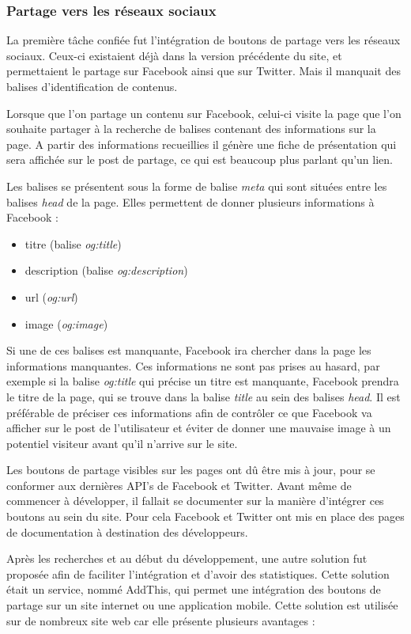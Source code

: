 \documentclass[12pt,a4paper]{article}
\begin{document}
\subsubsection{Partage vers les réseaux sociaux}
La première tâche confiée fut l'intégration de boutons de partage vers les réseaux sociaux. Ceux-ci existaient déjà dans la version précédente du site, et permettaient le partage sur Facebook ainsi que sur Twitter. Mais il manquait des balises d'identification de contenus.\par 
Lorsque que l'on partage un contenu sur Facebook, celui-ci visite la page que l'on souhaite partager à la recherche de balises contenant des informations sur la page. A partir des informations recueillies il génère une fiche de présentation qui sera affichée sur le post de partage, ce qui est beaucoup plus parlant qu'un lien.\par
Les balises se présentent sous la forme de balise \textit{meta} qui sont situées entre les balises \textit{head} de la page. Elles permettent de donner plusieurs informations à Facebook :
\begin{itemize}
\item titre (balise \textit{og:title})
\item description (balise \textit{og:description})
\item url (\textit{og:url})
\item image (\textit{og:image})
\end{itemize}
Si une de ces balises est manquante, Facebook ira chercher dans la page les informations manquantes. Ces informations ne sont pas prises au hasard, par exemple si la balise \textit{og:title} qui précise un titre est manquante, Facebook prendra le titre de la page, qui se trouve dans la balise \textit{title} au sein des balises \textit{head}. Il est préférable de préciser ces informations afin de contrôler ce que Facebook va afficher sur le post de l'utilisateur et éviter de donner une mauvaise image à un potentiel visiteur avant qu'il n'arrive sur le site.\par
\bigskip
Les boutons de partage visibles sur les pages ont dû être mis à jour, pour se conformer aux dernières API's de Facebook et Twitter. Avant même de commencer à développer, il fallait se documenter sur la manière d'intégrer ces boutons au sein du site. Pour cela Facebook et Twitter ont mis en place des pages de documentation à destination des développeurs. \par 
Après les recherches et au début du développement, une autre solution fut proposée afin de faciliter l'intégration et d'avoir des statistiques. Cette solution était un service, nommé AddThis, qui permet une intégration des boutons de partage sur un site internet ou une application mobile. Cette solution est utilisée sur de nombreux site web car elle présente plusieurs avantages : 
\end{document}

